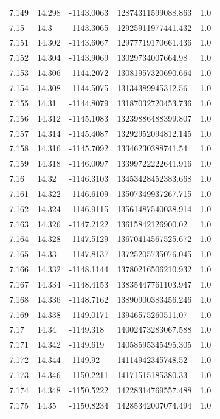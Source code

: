 \begin{tabular}{lllll}
7.149 & 14.298 & -1143.0063 & 12874311599088.863 & 1.0 \\
7.15 & 14.3 & -1143.3065 & 12925911977441.432 & 1.0 \\
7.151 & 14.302 & -1143.6067 & 12977719170661.436 & 1.0 \\
7.152 & 14.304 & -1143.9069 & 13029734007664.98 & 1.0 \\
7.153 & 14.306 & -1144.2072 & 13081957320690.664 & 1.0 \\
7.154 & 14.308 & -1144.5075 & 13134389945312.56 & 1.0 \\
7.155 & 14.31 & -1144.8079 & 13187032720453.736 & 1.0 \\
7.156 & 14.312 & -1145.1083 & 13239886488399.807 & 1.0 \\
7.157 & 14.314 & -1145.4087 & 13292952094812.145 & 1.0 \\
7.158 & 14.316 & -1145.7092 & 13346230388741.54 & 1.0 \\
7.159 & 14.318 & -1146.0097 & 13399722222641.916 & 1.0 \\
7.16 & 14.32 & -1146.3103 & 13453428452383.668 & 1.0 \\
7.161 & 14.322 & -1146.6109 & 13507349937267.715 & 1.0 \\
7.162 & 14.324 & -1146.9115 & 13561487540038.914 & 1.0 \\
7.163 & 14.326 & -1147.2122 & 13615842126900.02 & 1.0 \\
7.164 & 14.328 & -1147.5129 & 13670414567525.672 & 1.0 \\
7.165 & 14.33 & -1147.8137 & 13725205735076.045 & 1.0 \\
7.166 & 14.332 & -1148.1144 & 13780216506210.932 & 1.0 \\
7.167 & 14.334 & -1148.4153 & 13835447761103.947 & 1.0 \\
7.168 & 14.336 & -1148.7162 & 13890900383456.246 & 1.0 \\
7.169 & 14.338 & -1149.0171 & 13946575260511.07 & 1.0 \\
7.17 & 14.34 & -1149.318 & 14002473283067.588 & 1.0 \\
7.171 & 14.342 & -1149.619 & 14058595345495.305 & 1.0 \\
7.172 & 14.344 & -1149.92 & 14114942345748.52 & 1.0 \\
7.173 & 14.346 & -1150.2211 & 14171515185380.33 & 1.0 \\
7.174 & 14.348 & -1150.5222 & 14228314769557.488 & 1.0 \\
7.175 & 14.35 & -1150.8234 & 14285342007074.494 & 1.0 \\

\end{tabular}
